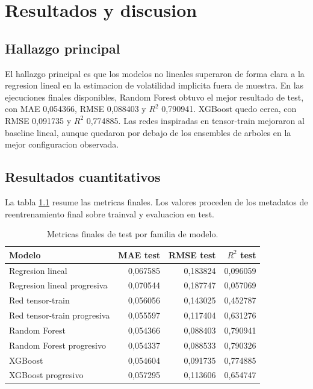 \chapter{Resultados y discusion}
\label{chap:resultados}

\section{Hallazgo principal}

El hallazgo principal es que los modelos no lineales superaron de forma clara a la regresion lineal en la estimacion de volatilidad implicita fuera de muestra. En las ejecuciones finales disponibles, Random Forest obtuvo el mejor resultado de test, con MAE 0,054366, RMSE 0,088403 y $R^2$ 0,790941. XGBoost quedo cerca, con RMSE 0,091735 y $R^2$ 0,774885. Las redes inspiradas en tensor-train mejoraron al baseline lineal, aunque quedaron por debajo de los ensembles de arboles en la mejor configuracion observada.

\section{Resultados cuantitativos}

La tabla \ref{tab:resultados-modelos} resume las metricas finales. Los valores proceden de los metadatos de reentrenamiento final sobre trainval y evaluacion en test.

\begin{table}[h]
\centering
\begin{tabular}{lrrr}
\toprule
Modelo & MAE test & RMSE test & $R^2$ test \\
\midrule
Regresion lineal & 0,067585 & 0,183824 & 0,096059 \\
Regresion lineal progresiva & 0,070544 & 0,187747 & 0,057069 \\
Red tensor-train & 0,056056 & 0,143025 & 0,452787 \\
Red tensor-train progresiva & 0,055597 & 0,117404 & 0,631276 \\
Random Forest & 0,054366 & 0,088403 & 0,790941 \\
Random Forest progresivo & 0,054337 & 0,088533 & 0,790326 \\
XGBoost & 0,054604 & 0,091735 & 0,774885 \\
XGBoost progresivo & 0,057295 & 0,113606 & 0,654747 \\
\bottomrule
\end{tabular}
\caption{Metricas finales de test por familia de modelo.}
\label{tab:resultados-modelos}
\end{table}

